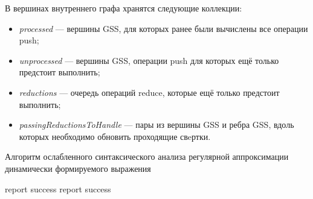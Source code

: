 В вершинах внутреннего графа хранятся следующие коллекции:
\begin{itemize}
  \item \emph{processed} --- вершины GSS, для которых ранее были вычислены все операции push;
  \item \emph{unprocessed} --- вершины GSS, операции push для которых ещё только предстоит выполнить;
  \item \emph{reductions} --- очередь операций reduce, которые ещё только предстоит выполнить;
  \item \emph{passingReductionsToHandle} --- пары из вершины GSS и ребра GSS, вдоль которых необходимо обновить проходящие свeртки.
\end{itemize}


\begin{algorithm}[H]
\begin{algorithmic}[1]
\caption{Алгоритм ослабленного синтаксического анализа регулярной аппроксимации динамически формируемого выражения}
\label{parsing}
     {report success}
    \EndIf
  \Else
    \EndWhile
     {report success}
    \EndIf
  \EndIf
\EndFunction
\end{algorithmic}
\end{algorithm}


